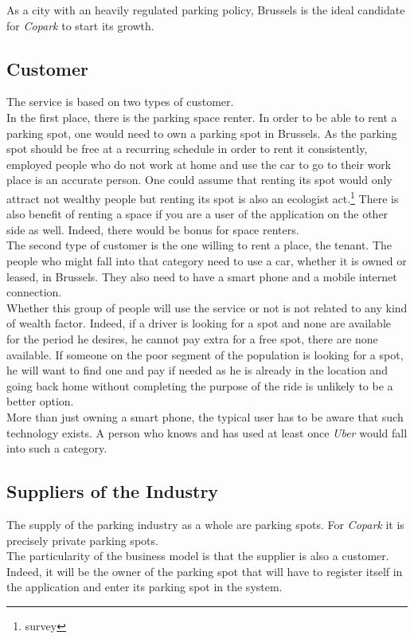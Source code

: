 \documentclass[12pt,a4paper,oneside]{book}
\newcommand{\bp}{\textit{Copark }}
\begin{document}
As a city with an heavily regulated parking policy, Brussels is the ideal candidate for \bp to start its growth.

\subsection{Customer}
The service is based on two types of customer.\\

In the first place, there is the parking space renter. In order to be able to rent a parking spot, one would need to own a parking spot in Brussels. As the parking spot should be free at a recurring schedule in order to rent it consistently, employed people who do not work at home and use the car to go to their work place is an accurate person. One could assume that renting its spot would only attract not wealthy people but renting its spot is also an ecologist act.\footnote{survey} There is also benefit of renting a space if you are a user of the application on the other side as well. Indeed, there would be bonus for space renters.\\

The second type of customer is the one willing to rent a place, the tenant. The people who might fall into that category need to use a car, whether it is owned or leased, in Brussels. They also need to have a smart phone and a mobile internet connection.\\
Whether this group of people will use the service or not is not related to any kind of wealth factor. Indeed, if a driver is looking for a spot and none are available for the period he desires, he cannot pay extra for a free spot, there are none available. If someone on the poor segment of the population is looking for a spot, he will want to find one and pay if needed as he is already in the location and going back home without completing the purpose of the ride is unlikely to be a better option.\\
More than just owning a smart phone, the typical user has to be aware that such technology exists. A person who knows and has used at least once \textit{Uber} would fall into such a category.

\subsection{Suppliers of the Industry}
The supply of the parking industry as a whole are parking spots. For \bp it is precisely private parking spots.\\
The particularity of the business model is that the supplier is also a customer. Indeed, it will be the owner of the parking spot that will have to register itself in the application and enter its parking spot in the system.
\end{document}
